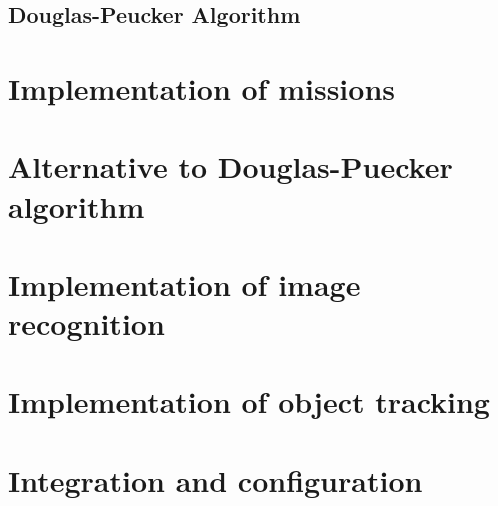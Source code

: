 \subsection{Douglas-Peucker Algorithm}

\section{Implementation of missions}

\section{Alternative to Douglas-Puecker algorithm}

\section{Implementation of image recognition}

\section{Implementation of object tracking}

\section{Integration and configuration}






